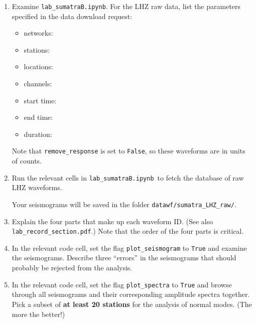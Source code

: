 \documentclass[11pt,titlepage,fleqn]{article}
\newcommand{\tfile}{{\tt lab\_sumatraB.ipynb}}
\begin{document}
\begin{enumerate}
\item Examine \tfile. For the LHZ raw data, list the parameters specified in the data download request:

\begin{itemize}
\item networks: 
\item stations: 
\item locations: 
\item channels: 
\item start time: 
\item end time: 
\item duration: 
\end{itemize}

Note that \verb+remove_response+ is set to \verb+False+, so these waveforms are in units of counts.



\item Run the relevant cells in \tfile\ to fetch the database of raw LHZ waveforms.

Your seismograms will be saved in the folder \verb+datawf/sumatra_LHZ_raw/+.

\item Explain the four parts that make up each waveform ID. (See also \verb+lab_record_section.pdf+.) Note that the order of the four parts is critical.

\item In the relevant code cell, set the flag \verb+plot_seismogram+ to \verb+True+ and examine the seismograms. Describe three ``errors'' in the seismograms that should probably be rejected from the analysis.


\item In the relevant code cell, set the flag \verb+plot_spectra+ to \verb+True+ and browse through all seismograms and their corresponding amplitude spectra together. Pick a subset of {\bf at least 20 stations} for the analysis of normal modes. (The more the better!)


\end{enumerate}
\end{document}
